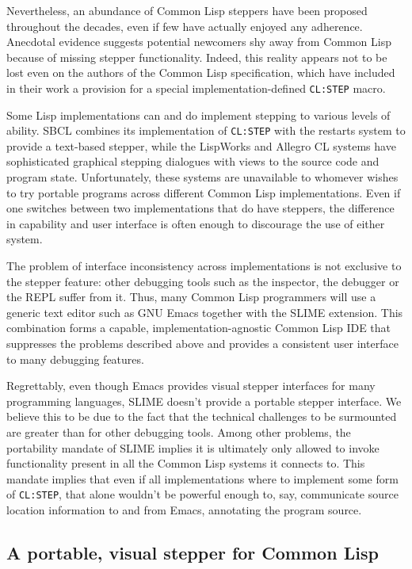 \documentclass[format=sigconf]{acmart}
\begin{document}
Nevertheless, an abundance of Common Lisp steppers have been proposed
throughout the decades, even if few have actually enjoyed any
adherence.  Anecdotal evidence suggests potential newcomers shy away
from Common Lisp because of missing stepper functionality.  Indeed,
this reality appears not to be lost even on the authors of the Common
Lisp specification, which have included in their work a provision for
a special implementation-defined \texttt{CL:STEP} macro.

Some Lisp implementations can and do implement stepping to various
levels of ability.  SBCL combines its implementation of
\texttt{CL:STEP} with the restarts system to provide a text-based
stepper, while the LispWorks\cite{lispworks-stepper} and Allegro CL
systems have sophisticated graphical stepping dialogues with views to
the source code and program state.  Unfortunately, these systems are
unavailable to whomever wishes to try portable programs across
different Common Lisp implementations.  Even if one switches between
two implementations that do have steppers, the difference in
capability and user interface is often enough to discourage the use of
either system.

The problem of interface inconsistency across implementations is not
exclusive to the stepper feature: other debugging tools such as the
inspector, the debugger or the REPL suffer from it.  Thus, many Common
Lisp programmers will use a generic text editor such as GNU
Emacs\cite{emacs} together with the SLIME\cite{slime} extension.  This
combination forms a capable, implementation-agnostic Common Lisp IDE
that suppresses the problems described above and provides a consistent
user interface to many debugging features.

Regrettably, even though Emacs provides visual stepper interfaces for
many programming languages, SLIME doesn't provide a portable stepper
interface.  We believe this to be due to the fact that the technical
challenges to be surmounted are greater than for other debugging
tools.  Among other problems, the portability mandate of SLIME implies
it is ultimately only allowed to invoke functionality present in all
the Common Lisp systems it connects to.  This mandate implies that
even if all implementations where to implement some form of
\texttt{CL:STEP}, that alone wouldn't be powerful enough to, say,
communicate source location information to and from Emacs, annotating
the program source.

\subsection{A portable, visual stepper for Common
  Lisp}
\end{document}
